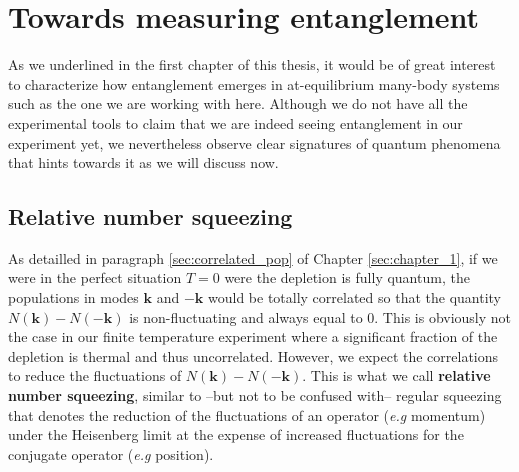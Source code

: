 \section{Towards measuring entanglement}

As we underlined in the first chapter of this thesis, it would be of great interest to characterize how entanglement emerges in at-equilibrium many-body systems such as the one we are working with here. Although we do not have all the experimental tools to claim that we are indeed seeing entanglement in our experiment yet, we nevertheless observe clear signatures of quantum phenomena that hints towards it as we will discuss now.



\subsection{Relative number squeezing}

As detailled in paragraph \ref{sec:correlated_pop} of Chapter \ref{sec:chapter_1}, if we were in the perfect situation $T=0$ were the depletion is fully quantum, the populations in modes $\bm{k}$ and $-\bm{k}$ would be totally correlated so that the quantity $N(\bm{k})-N(-\bm{k})$ is non-fluctuating and always equal to 0. This is obviously not the case in our finite temperature experiment where a significant fraction of the depletion is thermal and thus uncorrelated. However, we expect the \kmk correlations to reduce the fluctuations of $N(\bm{k})-N(-\bm{k})$. This is what we call \textbf{relative number squeezing}, similar to --but not to be confused with-- regular squeezing \cite{walls1983squeezed} that denotes the reduction of the fluctuations of an operator ({\it e.g} momentum) under the Heisenberg limit at the expense of increased fluctuations for the conjugate operator ({\it e.g} position).




